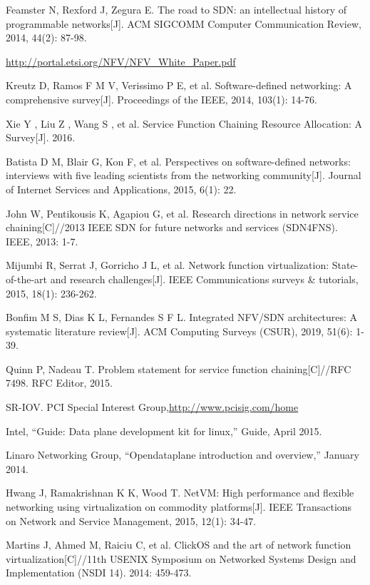 \documentclass{ieeeaccess}
\begin{document}
\begin{thebibliography}{00}

 Feamster N, Rexford J, Zegura E. The road to SDN: an intellectual history of programmable networks[J]. ACM SIGCOMM Computer Communication Review, 2014, 44(2): 87-98.

 \underline{http://portal.etsi.org/NFV/NFV\_White\_Paper.pdf}

 Kreutz D, Ramos F M V, Verissimo P E, et al. Software-defined networking: A comprehensive survey[J]. Proceedings of the IEEE, 2014, 103(1): 14-76.

 Xie Y , Liu Z , Wang S , et al. Service Function Chaining Resource Allocation: A Survey[J]. 2016.

 Batista D M, Blair G, Kon F, et al. Perspectives on software-defined networks: interviews with five leading scientists from the networking community[J]. Journal of Internet Services and Applications, 2015, 6(1): 22.

 John W, Pentikousis K, Agapiou G, et al. Research directions in network service chaining[C]//2013 IEEE SDN for future networks and services (SDN4FNS). IEEE, 2013: 1-7.

 Mijumbi R, Serrat J, Gorricho J L, et al. Network function virtualization: State-of-the-art and research challenges[J]. IEEE Communications surveys \& tutorials, 2015, 18(1): 236-262.

 Bonfim M S, Dias K L, Fernandes S F L. Integrated NFV/SDN architectures: A systematic literature review[J]. ACM Computing Surveys (CSUR), 2019, 51(6): 1-39.

 Quinn P, Nadeau T. Problem statement for service function chaining[C]//RFC 7498. RFC Editor, 2015.

 SR-IOV. PCI Special Interest Group,\underline{http://www.pcisig.com/home}

 Intel, “Guide: Data plane development kit for linux,” Guide, April 2015.

 Linaro Networking Group, “Opendataplane introduction and overview,” January 2014.

 Hwang J, Ramakrishnan K K, Wood T. NetVM: High performance and flexible networking using virtualization on commodity platforms[J]. IEEE Transactions on Network and Service Management, 2015, 12(1): 34-47.

 Martins J, Ahmed M, Raiciu C, et al. ClickOS and the art of network function virtualization[C]//11th {USENIX} Symposium on Networked Systems Design and Implementation ({NSDI} 14). 2014: 459-473.


\end{thebibliography}
\end{document}
